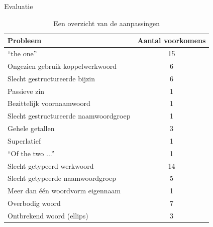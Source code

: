 \documentclass[notes, dvipsnames]{beamer}
\begin{document}
  \begin{frame}{Evaluatie}
    \begin{table}[t]
      \centering
      \begin{tabular}{lc}
        \hline
        \textbf{Probleem} & \textbf{Aantal voorkomens} \\ 
        \hline
        ``the one'' & 15 \\
        Ongezien gebruik koppelwerkwoord & 6 \\
        Slecht gestructureerde bijzin & 6 \\
        Passieve zin & 1 \\
        Bezittelijk voornaamwoord & 1 \\
        Slecht gestructureerde naamwoordgroep & 1 \\
        \hline
        Gehele getallen & 3 \\
        Superlatief & 1 \\
        ``Of the two ...'' & 1 \\
        \hline
        Slecht getypeerd werkwoord & 14 \\
        Slecht getypeerde naamwoordgroep & 5 \\
        \hline
        Meer dan één woordvorm eigennaam  & 1 \\
        \hline
        Overbodig woord & 7 \\
        Ontbrekend woord (ellips) & 3 \\
        \hline
      \end{tabular}
      \caption{Een overzicht van de aanpassingen}
      \label{tbl:resultaten}
    \end{table}
  \end{frame}
\end{document}
